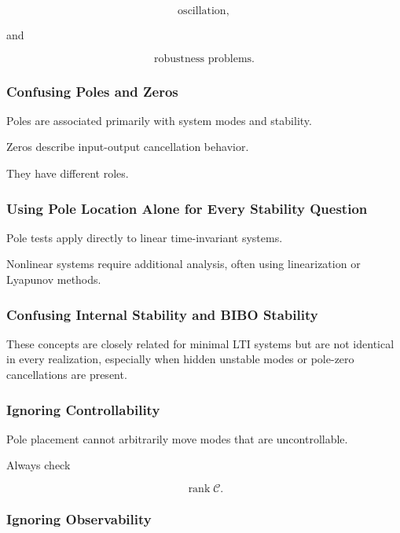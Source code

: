 \[
\boxed{
\text{oscillation},
}
\]

and

\[
\boxed{
\text{robustness problems}.
}
\]

\subsubsection{Confusing Poles and Zeros}

Poles are associated primarily with system modes and stability.

Zeros describe input-output cancellation behavior.

They have different roles.

\subsubsection{Using Pole Location Alone for Every Stability Question}

Pole tests apply directly to linear time-invariant systems.

Nonlinear systems require additional analysis, often using linearization or
Lyapunov methods.

\subsubsection{Confusing Internal Stability and BIBO Stability}

These concepts are closely related for minimal LTI systems but are not
identical in every realization, especially when hidden unstable modes or
pole-zero cancellations are present.

\subsubsection{Ignoring Controllability}

Pole placement cannot arbitrarily move modes that are uncontrollable.

Always check

\[
\operatorname{rank}\mathcal{C}.
\]

\subsubsection{Ignoring Observability}

